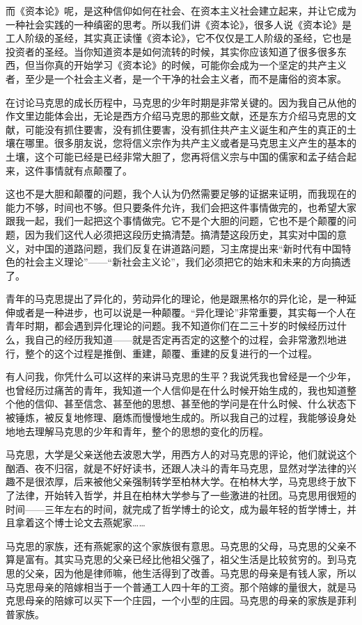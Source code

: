 \documentclass[UTF8, 12pt, a4paper]{ctexrep}
\begin{document}
而《资本论》呢，是这种信仰如何在社会、在资本主义社会建立起来，并让它成为一种社会实践的一种缜密的思考。所以我们讲《资本论》，很多人说《资本论》是工人阶级的圣经，其实真正读懂《资本论》，它不仅仅是工人阶级的圣经，它也是投资者的圣经。当你知道资本是如何流转的时候，其实你应该知道了很多很多东西，但当你真的开始学习《资本论》的时候，可能你会成为一个坚定的共产主义者，至少是一个社会主义者，是一个干净的社会主义者，而不是庸俗的资本家。

在讨论马克思的成长历程中，马克思的少年时期是非常关键的。因为我自己从他的作文里边能体会出，无论是西方介绍马克思的那些文献，还是东方介绍马克思的文献，可能没有抓住要害，没有抓住要害，没有抓住共产主义诞生和产生的真正的土壤在哪里。很多朋友说，您将信义宗作为共产主义或者是马克思主义产生的基本的土壤，这个可能已经是已经非常大胆了，您再将信义宗与中国的儒家和孟子结合起来，这件事情就有点颠覆了。

这也不是大胆和颠覆的问题，我个人认为仍然需要足够的证据来证明，而我现在的能力不够，时间也不够。但只要条件允许，我们会把这件事情做完的，也希望大家跟我一起，我们一起把这个事情做完。它不是个大胆的问题，它也不是个颠覆的问题，因为我们这代人必须把这段历史搞清楚。搞清楚这段历史，其实对中国的意义，对中国的道路问题，我们反复在讲道路问题，习主席提出来“新时代有中国特色的社会主义理论”——“新社会主义论”，我们必须把它的始末和未来的方向搞透了。

青年的马克思提出了异化的，劳动异化的理论，他是跟黑格尔的异化论，是一种延伸或者是一种进步，也可以说是一种颠覆。“异化理论”非常重要，其实每一个人在青年时期，都会遇到异化理论的问题。我不知道你们在二三十岁的时候经历过什么，我自己的经历我知道——就是否定再否定的这整个的过程，会非常激烈地进行，整个的这个过程是推倒、重建，颠覆、重建的反复进行的一个过程。

有人问我，你凭什么可以这样的来讲马克思的生平？我说凭我也曾经是一个少年，也曾经历过痛苦的青年，我知道一个人信仰是在什么时候开始生成的，我也知道整个他的信仰、甚至信念、甚至他的思想、甚至他的学问是在什么时候、什么状态下被锤炼，被反复地修理、磨炼而慢慢地生成的。所以我自己的过程，我能够设身处地地去理解马克思的少年和青年，整个的思想的变化的历程。

马克思，大学是父亲送他去波恩大学，用西方人的对马克思的评论，他们就说这个酗酒、夜不归宿，就是不好好读书，还跟人决斗的青年马克思，显然对学法律的兴趣不是很浓厚，后来被他父亲强制转学至柏林大学。在柏林大学，马克思终于放下了法律，开始转入哲学，并且在柏林大学参与了一些激进的社团。马克思用很短的时间——三年左右的时间，就完成了哲学博士的论文，成为最年轻的哲学博士，并且拿着这个博士论文去燕妮家……

马克思的家族，还有燕妮家的这个家族很有意思。马克思的父母，马克思的父亲不算是富有。其实马克思的父亲已经比他祖父强了，祖父生活是比较贫穷的。到马克思的父亲，因为他是律师嘛，他生活得到了改善。马克思的母亲是有钱人家，所以马克思母亲的陪嫁相当于一个普通工人四十年的工资。那个陪嫁的量很大，就是马克思母亲的陪嫁可以买下一个庄园，一个小型的庄园。马克思的母亲的家族是菲利普家族。
\end{document}
